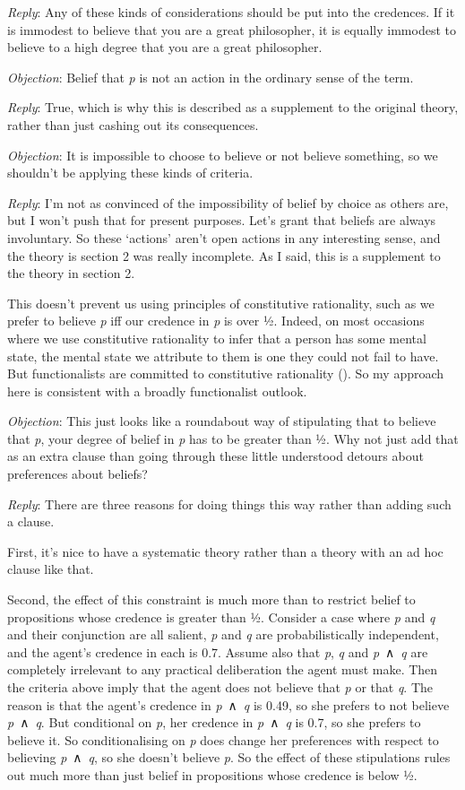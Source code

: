 \documentclass[
  11pt,
  letterpaper,
  DIV=11,
  numbers=noendperiod,
  twoside]{scrartcl}
\begin{document}
\emph{Reply}: Any of these kinds of considerations should be put into
the credences. If it is immodest to believe that you are a great
philosopher, it is equally immodest to believe to a high degree that you
are a great philosopher.

\emph{Objection}: Belief that \emph{p} is not an action in the ordinary
sense of the term.

\emph{Reply}: True, which is why this is described as a supplement to
the original theory, rather than just cashing out its consequences.

\emph{Objection}: It is impossible to choose to believe or not believe
something, so we shouldn't be applying these kinds of criteria.

\emph{Reply}: I'm not as convinced of the impossibility of belief by
choice as others are, but I won't push that for present purposes. Let's
grant that beliefs are always involuntary. So these `actions' aren't
open actions in any interesting sense, and the theory is section 2 was
really incomplete. As I said, this is a supplement to the theory in
section 2.

This doesn't prevent us using principles of constitutive rationality,
such as we prefer to believe \emph{p} iff our credence in \emph{p} is
over ½. Indeed, on most occasions where we use constitutive rationality
to infer that a person has some mental state, the mental state we
attribute to them is one they could not fail to have. But functionalists
are committed to constitutive rationality
(). So my approach here is
consistent with a broadly functionalist outlook.

\emph{Objection}: This just looks like a roundabout way of stipulating
that to believe that \emph{p}, your degree of belief in \emph{p} has to
be greater than ½. Why not just add that as an extra clause than going
through these little understood detours about preferences about beliefs?

\emph{Reply}: There are three reasons for doing things this way rather
than adding such a clause.

First, it's nice to have a systematic theory rather than a theory with
an ad hoc clause like that.

Second, the effect of this constraint is much more than to restrict
belief to propositions whose credence is greater than ½. Consider a case
where \emph{p} and \emph{q} and their conjunction are all salient,
\emph{p} and \emph{q} are probabilistically independent, and the agent's
credence in each is 0.7. Assume also that \emph{p}, \emph{q} and
\emph{p}~∧~\emph{q} are completely irrelevant to any practical
deliberation the agent must make. Then the criteria above imply that the
agent does not believe that \emph{p} or that \emph{q}. The reason is
that the agent's credence in \emph{p}~∧~\emph{q} is 0.49, so she prefers
to not believe \emph{p}~∧~\emph{q}. But conditional on \emph{p}, her
credence in \emph{p}~∧~\emph{q} is 0.7, so she prefers to believe it. So
conditionalising on \emph{p} does change her preferences with respect to
believing \emph{p}~∧~\emph{q}, so she doesn't believe \emph{p}. So the
effect of these stipulations rules out much more than just belief in
propositions whose credence is below ½.
\end{document}
